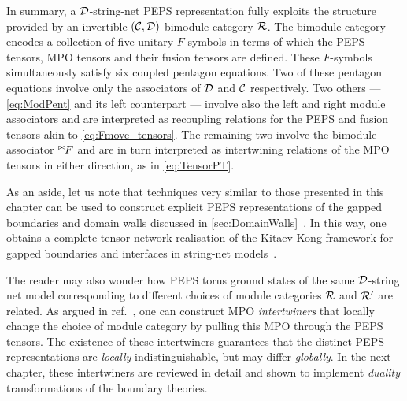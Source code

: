 \bigskip\noindent In summary, a $\mathcal{D}$-string-net PEPS representation fully exploits the structure provided by an invertible $(\mathcal{C},\mathcal{D})$-bimodule category $\mathcal{R}$. The bimodule category encodes a collection of five unitary $F$-symbols in terms of which the PEPS tensors, MPO tensors and their fusion tensors are defined. These $F$-symbols simultaneously satisfy six coupled pentagon equations. Two of these pentagon equations involve only the associators of $\mathcal{D}$ and $\mathcal{C}$ respectively. Two others --- \cref{eq:ModPent} and its left counterpart --- involve also the left and right module associators and are interpreted as recoupling relations for the PEPS and fusion tensors akin to \cref{eq:Fmove_tensors}. The remaining two involve the bimodule associator ${}^{\bowtie\!} F$ and are in turn interpreted as intertwining relations of the MPO tensors in either direction, as in \cref{eq:TensorPT}.

\bigskip\noindent As an aside, let us note that techniques very similar to those presented in this chapter can be used to construct explicit PEPS representations of the gapped boundaries and domain walls discussed in \cref{sec:DomainWalls}~\cite{Lootens2020}. In this way, one obtains a complete tensor network realisation of the Kitaev-Kong framework for gapped boundaries and interfaces in string-net models~\cite{Kitaev2011,Kong2012}.

The reader may also wonder how PEPS torus ground states of the same $\mathcal{D}$-string net model corresponding to different choices of module categories $\mathcal{R}$ and $\mathcal{R}'$ are related. As argued in ref.~\cite{Lootens2020}, one can construct MPO \emph{intertwiners} that locally change the choice of module category by pulling this MPO through the PEPS tensors. The existence of these intertwiners guarantees that the distinct PEPS representations are \emph{locally} indistinguishable, but may differ \emph{globally}. In the next chapter, these intertwiners are reviewed in detail and shown to implement \emph{duality} transformations of the boundary theories.
